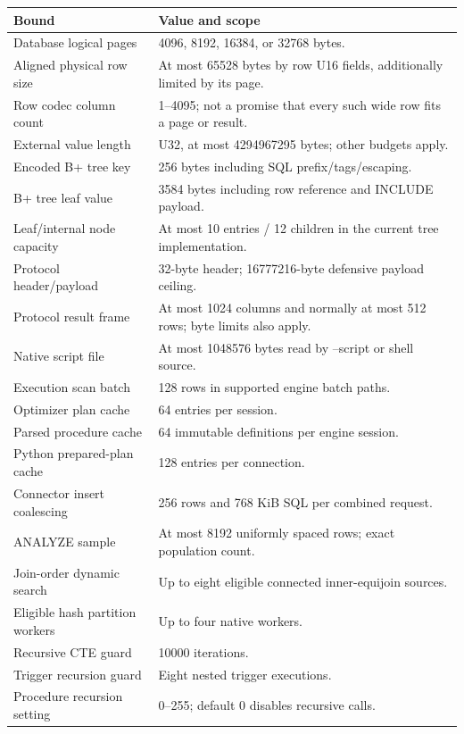 \begin{longtable}{p{.4\linewidth}p{.49\linewidth}}
\toprule Bound & Value and scope \\\midrule
Database logical pages & 4096, 8192, 16384, or 32768 bytes. \\
Aligned physical row size & At most 65528 bytes by row U16 fields, additionally limited by its page. \\
Row codec column count & 1--4095; not a promise that every such wide row fits a page or result. \\
External value length & U32, at most 4294967295 bytes; other budgets apply. \\
Encoded B+ tree key & 256 bytes including SQL prefix/tags/escaping. \\
B+ tree leaf value & 3584 bytes including row reference and INCLUDE payload. \\
Leaf/internal node capacity & At most 10 entries / 12 children in the current tree implementation. \\
Protocol header/payload & 32-byte header; 16777216-byte defensive payload ceiling. \\
Protocol result frame & At most 1024 columns and normally at most 512 rows; byte limits also apply. \\
Native script file & At most 1048576 bytes read by --script or shell source. \\
Execution scan batch & 128 rows in supported engine batch paths. \\
Optimizer plan cache & 64 entries per session. \\
Parsed procedure cache & 64 immutable definitions per engine session. \\
Python prepared-plan cache & 128 entries per connection. \\
Connector insert coalescing & 256 rows and 768 KiB SQL per combined request. \\
ANALYZE sample & At most 8192 uniformly spaced rows; exact population count. \\
Join-order dynamic search & Up to eight eligible connected inner-equijoin sources. \\
Eligible hash partition workers & Up to four native workers. \\
Recursive CTE guard & 10000 iterations. \\
Trigger recursion guard & Eight nested trigger executions. \\
Procedure recursion setting & 0--255; default 0 disables recursive calls. \\

\end{longtable}
